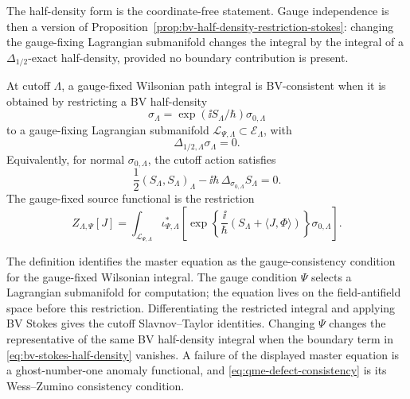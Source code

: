 The half-density form is the coordinate-free statement.  Gauge independence is
then a version of Proposition~\ref{prop:bv-half-density-restriction-stokes}:
changing the gauge-fixing Lagrangian submanifold changes the integral by the
integral of a \(\Delta_{1/2}\)-exact half-density, provided no boundary
contribution is present.

\begin{definition}
\label{def:gauge-fixed-wilsonian-bv-consistency}
At cutoff \(\Lambda\), a gauge-fixed Wilsonian path integral is BV-consistent
when it is obtained by restricting a BV half-density
\[
  \sigma_\Lambda
  =
  \exp(\ii S_\Lambda/\hbar)\sigma_{0,\Lambda}
\]
to a gauge-fixing Lagrangian submanifold
\(\mathcal L_{\Psi,\Lambda}\subset\mathcal E_\Lambda\), with
\[
  \Delta_{1/2,\Lambda}\sigma_\Lambda=0 .
\]
Equivalently, for normal \(\sigma_{0,\Lambda}\), the cutoff action satisfies
\[
  \frac12(S_\Lambda,S_\Lambda)_\Lambda
  -\ii\hbar\,\Delta_{\sigma_{0,\Lambda}}S_\Lambda=0 .
\]
The gauge-fixed source functional is the restriction
\[
  Z_{\Lambda,\Psi}[J]
  =
  \int_{\mathcal L_{\Psi,\Lambda}}
  \iota_{\Psi,\Lambda}^*
  \left[
    \exp\left\{\frac{\ii}{\hbar}
    \left(S_\Lambda+\langle J,\Phi\rangle\right)\right\}
    \sigma_{0,\Lambda}
  \right].
\]
\end{definition}

The definition identifies the master equation as the gauge-consistency
condition for the gauge-fixed Wilsonian integral.  The gauge condition
\(\Psi\) selects a Lagrangian submanifold for computation; the equation lives
on the field-antifield space before this restriction.  Differentiating the
restricted integral and applying BV Stokes gives the cutoff
Slavnov--Taylor identities.  Changing \(\Psi\) changes the representative of
the same BV half-density integral when the boundary term in
\eqref{eq:bv-stokes-half-density} vanishes.  A failure of the displayed
master equation is a ghost-number-one anomaly functional, and
\eqref{eq:qme-defect-consistency} is its Wess--Zumino consistency condition.

